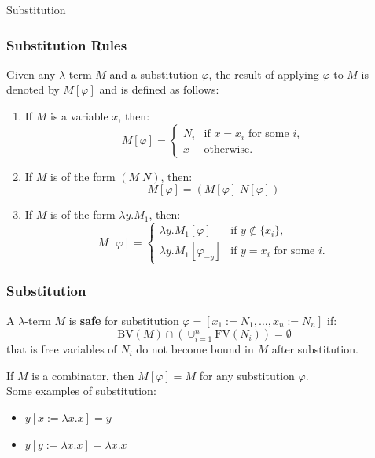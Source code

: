 \documentclass{beamer}
\begin{document}
\begin{frame}{Substitution}
  \frametitle{Substitution Rules}
  
  Given any $\lambda$-term \(M\) and a substitution \(\varphi\), the result of applying \(\varphi\) to \(M\) is denoted by \(M[\varphi]\) and is defined as follows:
  \begin{enumerate}
    \item If \(M\) is a variable \(x\), then:
      \[
      M[\varphi] = 
      \begin{cases} 
        N_i & \text{if } x = x_i \text{ for some } i, \\
        x & \text{otherwise.}
      \end{cases}
      \]
    \item If \(M\) is of the form \((M \; N)\), then:
      \[
      M[\varphi] = (M[\varphi] \; N[\varphi])
      \]
    \item If \(M\) is of the form \(\lambda y.M_1\), then:
      \[
      M[\varphi] = 
      \begin{cases} 
        \lambda y.M_1[\varphi] & \text{if } y \notin \{x_i\}, \\
        \lambda y.M_1[\varphi_{-y}] & \text{if } y = x_i \text{ for some } i.
      \end{cases}
      \]
  \end{enumerate}
\end{frame}

\begin{frame}
  \frametitle{Substitution}

  A \(\lambda\)-term \(M\) is \textbf{safe} for substitution \(\varphi = [x_1 := N_1, \ldots, x_n := N_n]\) if:
  \[
    \text{BV}(M) \cap (\cup_{i=1}^n \text{FV}(N_i)) = \emptyset
  \] 
  that is free variables of \(N_i\) do not become bound in \(M\) after substitution.\\
  \vspace{1em}

  If \(M\) is a combinator, then \(M[\varphi] = M\) for any substitution \(\varphi\).\\

  Some examples of substitution:
  \begin{itemize}
    \item \(y[x:=\lambda x.x] = y\) 
    \item \(y[y:=\lambda x.x] = \lambda x.x\)
  \end{itemize}
\end{frame}


\end{document}
